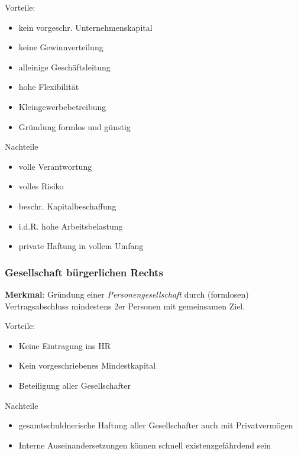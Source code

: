 \documentclass[]{article}
\begin{document}
\begin{minipage}[t]{0.45\textwidth}
	Vorteile:
	\begin{itemize}
		\item kein vorgeschr. Unternehmenskapital
		\item keine Gewinnverteilung
		\item alleinige Geschäftsleitung
		\item hohe Flexibilität
		\item Kleingewerbebetreibung
		\item Gründung formlos und günstig
	\end{itemize}
\end{minipage}
\hfill
\begin{minipage}[t]{0.45\textwidth}
	Nachteile
	\begin{itemize}
		\item volle Verantwortung
		\item volles Risiko
		\item beschr. Kapitalbeschaffung
		\item i.d.R. hohe Arbeitsbelastung
		\item private Haftung in vollem Umfang
	\end{itemize}
\end{minipage}

\subsubsection{Gesellschaft bürgerlichen Rechts}
\textbf{Merkmal}: Gründung einer \textit{Personengesellschaft} durch (formlosen) Vertragsabschluss mindestens 2er Personen mit gemeinsamen Ziel.

\begin{minipage}[t]{0.45\textwidth}
	Vorteile:
	\begin{itemize}
		\item Keine Eintragung ins HR
		\item Kein vorgeschriebenes Mindestkapital
		\item Beteiligung aller Gesellschafter
	\end{itemize}
\end{minipage}
\hfill
\begin{minipage}[t]{0.45\textwidth}
	Nachteile
	\begin{itemize}
		\item gesamtschuldnerische Haftung aller Gesellschafter auch mit Privatvermögen
		\item Interne Auseinandersetzungen können schnell existenzgefährdend sein
	\end{itemize}
\end{minipage}
\end{document}
